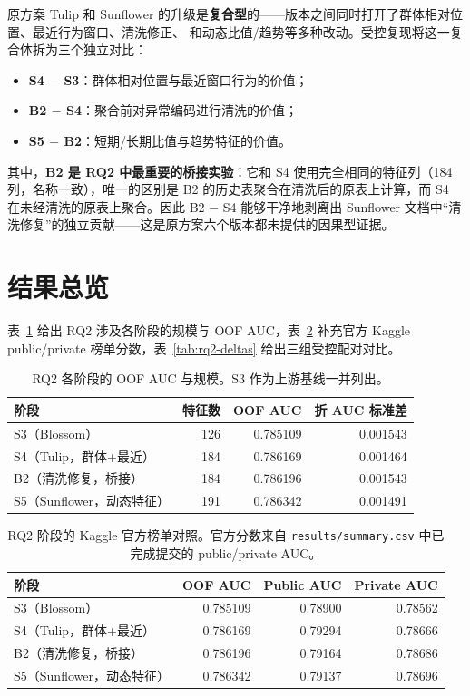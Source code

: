 \documentclass[11pt,UTF8,fontset=windows]{ctexrep}
\begin{document}
原方案 Tulip 和 Sunflower 的升级是\textbf{复合型}的——版本之间同时打开了群体相对位置、最近行为窗口、清洗修正、
和动态比值/趋势等多种改动。受控复现将这一复合体拆为三个独立对比：

\begin{itemize}
\item \textbf{S4 $-$ S3}：群体相对位置与最近窗口行为的价值；
\item \textbf{B2 $-$ S4}：聚合前对异常编码进行清洗的价值；
\item \textbf{S5 $-$ B2}：短期/长期比值与趋势特征的价值。
\end{itemize}

其中，\textbf{B2 是 RQ2 中最重要的桥接实验}：它和 S4 使用完全相同的特征列（184 列，名称一致），唯一的区别是
B2 的历史表聚合在清洗后的原表上计算，而 S4 在未经清洗的原表上聚合。因此 B2 $-$ S4 能够干净地剥离出 Sunflower
文档中“清洗修复”的独立贡献——这是原方案六个版本都未提供的因果型证据。

\section{结果总览}

表~\ref{tab:rq2-stages} 给出 RQ2 涉及各阶段的规模与 OOF AUC，表~\ref{tab:rq2-kaggle} 补充官方 Kaggle
public/private 榜单分数，表~\ref{tab:rq2-deltas} 给出三组受控配对对比。

\begin{table}[h]
\centering
\caption{RQ2 各阶段的 OOF AUC 与规模。S3 作为上游基线一并列出。}
\label{tab:rq2-stages}
\begin{tabular}{lrrr}
\toprule
阶段 & 特征数 & OOF AUC & 折 AUC 标准差 \\
\midrule
S3（Blossom）            & 126 & 0.785109 & 0.001543 \\
S4（Tulip，群体+最近）   & 184 & 0.786169 & 0.001464 \\
B2（清洗修复，桥接）     & 184 & 0.786196 & 0.001543 \\
S5（Sunflower，动态特征）& 191 & 0.786342 & 0.001491 \\
\bottomrule
\end{tabular}
\end{table}

\begin{table}[h]
\centering
\caption{RQ2 阶段的 Kaggle 官方榜单对照。官方分数来自 \texttt{results/summary.csv} 中已完成提交的 public/private AUC。}
\label{tab:rq2-kaggle}
\begin{tabular}{lrrr}
\toprule
阶段 & OOF AUC & Public AUC & Private AUC \\
\midrule
S3（Blossom）            & 0.785109 & 0.78900 & 0.78562 \\
S4（Tulip，群体+最近）   & 0.786169 & 0.79294 & 0.78666 \\
B2（清洗修复，桥接）     & 0.786196 & 0.79164 & 0.78686 \\
S5（Sunflower，动态特征）& 0.786342 & 0.79137 & 0.78696 \\
\bottomrule
\end{tabular}
\end{table}
\end{document}
